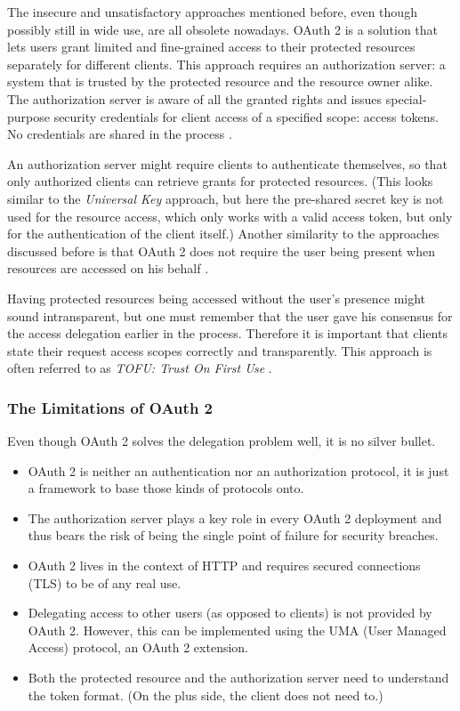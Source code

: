 The insecure and unsatisfactory approaches mentioned before, even though possibly still in wide use, are all obsolete nowadays. OAuth 2 is a solution that lets users grant limited and fine-grained access to their protected resources separately for different clients. This approach requires an authorization server: a system that is trusted by the protected resource and the resource owner alike. The authorization server is aware of all the granted rights and issues special-purpose security credentials for client access of a specified scope: access tokens. No credentials are shared in the process \cite[p. 11]{oauth2-in-action}.

An authorization server might require clients to authenticate themselves, so that only authorized clients can retrieve grants for protected resources. (This looks similar to the \textit{Universal Key} approach, but here the pre-shared secret key is not used for the resource access, which only works with a valid access token, but only for the authentication of the client itself.) Another similarity to the approaches discussed before is that OAuth 2 does not require the user being present when resources are accessed on his behalf \cite[p. 14]{oauth2-in-action}.

Having protected resources being accessed without the user's presence might sound intransparent, but one must remember that the user gave his consensus for the access delegation earlier in the process. Therefore it is important that clients state their request access scopes correctly and transparently. This approach is often referred to as \textit{TOFU: Trust On First Use} \cite[p. 15]{oauth2-in-action}.

\subsubsection{The Limitations of OAuth 2}

Even though OAuth 2 solves the delegation problem well, it is no silver bullet.

\begin{itemize}
    \item OAuth 2 is neither an authentication nor an authorization protocol, it is just a framework to base those kinds of protocols onto.
    \item The authorization server plays a key role in every OAuth 2 deployment and thus bears the risk of being the single point of failure for security breaches.
    \item OAuth 2 lives in the context of HTTP and requires secured connections (TLS) to be of any real use.
    \item Delegating access to other users (as opposed to clients) is not provided by OAuth 2. However, this can be implemented using the UMA (User Managed Access) protocol, an OAuth 2 extension.
    \item Both the protected resource and the authorization server need to understand the token format. (On the plus side, the client does not need to.)
\end{itemize}

